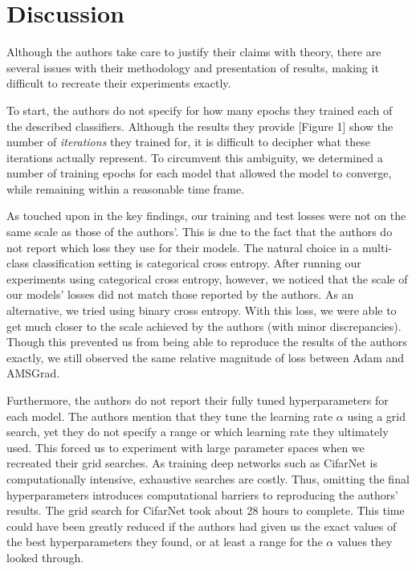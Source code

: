 \documentclass[letterpaper, 10 pt, conference]{ieeeconf}  %
\begin{document}
\section{Discussion}

Although the authors take care to justify their claims with theory, there are several issues with their methodology and presentation of results, making it difficult to recreate their experiments exactly. 

To start, the authors do not specify for how many epochs they trained each of the described classifiers. Although the results they provide [Figure 1] show the number of \emph{iterations} they trained for, it is difficult to decipher what these iterations actually represent. To circumvent this ambiguity, we determined a number of training epochs for each model that allowed the model to converge, while remaining within a reasonable time frame. 

As touched upon in the key findings, our training and test losses were not on the same scale as those of the authors'. This is due to the fact that the authors do not report which loss they use for their models. The natural choice in a multi-class classification setting is categorical cross entropy. After running our experiments using categorical cross entropy, however, we noticed that the scale of our models' losses did not match those reported by the authors. As an alternative, we tried using binary cross entropy. With this loss, we were able to get much closer to the scale achieved by the authors (with minor discrepancies). Though this prevented us from being able to reproduce the results of the authors exactly, we still observed the same relative magnitude of loss between Adam and AMSGrad. 

Furthermore, the authors do not report their fully tuned hyperparameters for each model. The authors mention that they tune the learning rate $\alpha$ using a grid search, yet they do not specify a range or which learning rate they ultimately used. This forced us to experiment with large parameter spaces when we recreated their grid searches. As training deep networks such as CifarNet is computationally intensive, exhaustive searches are costly. Thus, omitting the final hyperparameters introduces computational barriers to reproducing the authors' results. The grid search for CifarNet took about 28 hours to complete. This time could have been greatly reduced if the authors had given us the exact values of the best hyperparameters they found, or at least  a range for the $\alpha$ values they looked through. 
\end{document}
